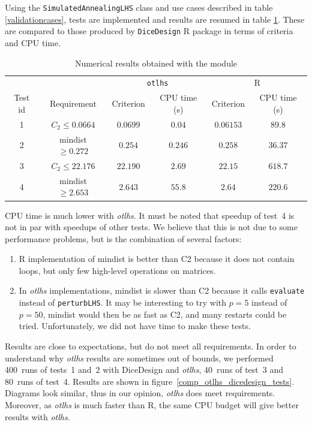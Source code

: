 Using the \texttt{SimulatedAnnealingLHS} class and use cases described in table \ref{validationcases}, tests are implemented and results are resumed in table \ref{results_module}.
These are compared to those produced by \texttt{DiceDesign} R package in terms of criteria and CPU time. 

\begin{table}[h]
\centering
\begin{tabular}{|c|c||c|c||c|c|}
 \hline
         &             & \multicolumn{2}{c||}{\texttt{otlhs}} & \multicolumn{2}{c|}{R} \\
\cline{3-6}
 Test id & Requirement & Criterion & CPU time (s) & Criterion & CPU time (s) \\
 \hline
 1 & $C_2 \leq 0.0664$ & $0.0699$ & $0.04$ & $0.06153$ & $89.8$\\
 \hline
 2 & mindist $\geq 0.272$ & $0.254$ & $0.246$ & $0.258$ & $36.37$\\
 \hline
 3 & $C_2 \leq 22.176$ & $22.190$ & $2.69$ & $22.15$& $618.7$ \\
 \hline
 4 & mindist $\geq 2.653$ & $2.643$ & $55.8$& $2.64$& $220.6$\\
 \hline
\end{tabular}
\caption{Numerical results obtained with the module}
\label{results_module}
\end{table}

CPU time is much lower with \textit{otlhs}.  It must be noted that speedup of
test~4 is not in par with speedups of other tests.  We believe that this is not
due to some performance problems, but is the combination of several factors:
\begin{enumerate}
\item R implementation of mindist is better than C2 because it does not contain loops, but only few high-level operations on matrices.
\item In \textit{otlhs} implementations, mindist is slower than C2 because it calls \texttt{evaluate} instead of \texttt{perturbLHS}.  It may be interesting to try with $p=5$ instead of $p=50$, mindist would then be as fast as C2, and many restarts could be tried.  Unfortunately, we did not have time to make these tests.
\end{enumerate}

Results are close to expectations, but do not meet all requirements.  In order to understand why \textit{otlhs} results are sometimes out of bounds, we performed 400~runs of tests~1 and~2 with DiceDesign and \textit{otlhs}, 40~runs of test~3 and 80~runs of test~4.
Results are shown in figure~\ref{comp_otlhs_dicedesign_tests}.
Diagrams look similar, thus in our opinion, \textit{otlhs} does meet requirements.  Moreover, as \textit{otlhs} is much faster than R, the same CPU budget will give better results with \textit{otlhs}.

